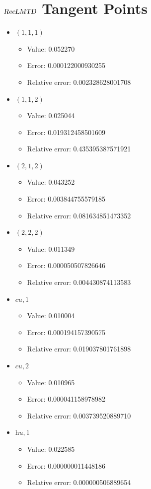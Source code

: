 \documentclass{article}%
\begin{document}
\section{$\textsl{RecLMTD}$ Tangent Points}%
\thispagestyle{plain}%
\begin{itemize}%
	\item $(1, 1, 1)$%
	\begin{itemize}%
		\item Value: 0.052270%
		\item Error: 0.000122000930255%
		\item Relative error: 0.002328628001708%
	\end{itemize}%
	\item $(1, 1, 2)$%
	\begin{itemize}%
		\item Value: 0.025044%
		\item Error: 0.019312458501609%
		\item Relative error: 0.435395387571921%
	\end{itemize}%
	\item $(2, 1, 2)$%
	\begin{itemize}%
		\item Value: 0.043252%
		\item Error: 0.003844755579185%
		\item Relative error: 0.081634851473352%
	\end{itemize}%
	\item $(2, 2, 2)$%
	\begin{itemize}%
		\item Value: 0.011349%
		\item Error: 0.000050507826646%
		\item Relative error: 0.004430874113583%
	\end{itemize}%
	\item $\textit{cu},1$%
	\begin{itemize}%
		\item Value: 0.010004%
		\item Error: 0.000194157390575%
		\item Relative error: 0.019037801761898%
	\end{itemize}%
	\item $\textit{cu},2$%
	\begin{itemize}%
		\item Value: 0.010965%
		\item Error: 0.000041158978982%
		\item Relative error: 0.003739520889710%
	\end{itemize}%
	\item $\textit{hu},1$%
	\begin{itemize}%
		\item Value: 0.022585%
		\item Error: 0.000000011448186%
		\item Relative error: 0.000000506889654%
	\end{itemize}%
\end{itemize}%
\end{document}
